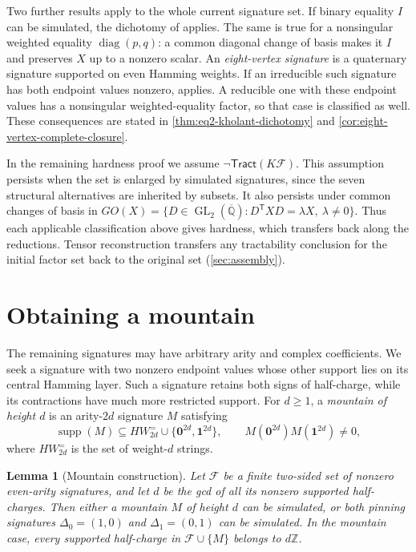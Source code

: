 \documentclass[11pt,letterpaper,onecolumn]{article}
\theoremstyle{plain}
\newtheorem{lemma}[lemma]{Lemma}
\theoremstyle{definition}
\theoremstyle{remark}
\newcommand{\AlgNums}{\overline{\mathbb Q}}
\newcommand{\cF}{\mathcal F}
\newcommand{\Tract}{\mathsf{Tract}}
\newcommand{\GL}{\operatorname{GL}}
\newcommand{\diag}{\operatorname{diag}}
\newcommand{\supp}{\operatorname{supp}}
\newcommand{\one}{\mathbf 1}
\newcommand{\zero}{\mathbf 0}
\begin{document}
Two further results apply to the whole current signature set. If binary
equality \(I\) can be simulated, the dichotomy of
\cite[Theorem~1.2]{Liu2026DEQ2Holant} applies. The same is true for a
nonsingular weighted equality \(\diag(p,q)\): a common diagonal change of
basis makes it \(I\) and preserves \(X\) up to a nonzero scalar.
An \emph{eight-vertex signature} is a quaternary signature supported on
even Hamming weights. If an irreducible such signature has both endpoint
values nonzero, \cite[Theorem~1.3]{Liu2026DEQ2Holant} applies. A reducible
one with these endpoint values has a nonsingular weighted-equality
factor, so that case is classified as well. These consequences are stated in \cref{thm:eq2-kholant-dichotomy} and
\cref{cor:eight-vertex-complete-closure}.

In the remaining hardness proof we assume \(\neg\Tract(K\cF)\).
This assumption persists when the set is enlarged by simulated signatures,
since the seven structural alternatives are inherited by subsets. It also persists under
common changes of basis in
\(GO(X)=\{D\in\GL_2(\AlgNums):D^{\mathsf T}XD=\lambda X,
\ \lambda\ne0\}\). Thus each applicable classification above gives
hardness, which transfers back along the reductions. Tensor reconstruction
transfers any tractability conclusion for the initial factor set back to
the original set (\cref{sec:assembly}).

\section{Obtaining a mountain}
\label{short:sec:mountain}

The remaining signatures may have arbitrary arity and complex
coefficients. We seek a signature with two nonzero endpoint values whose
other support lies on its central Hamming layer. Such a signature retains
both signs of half-charge, while its contractions have much more
restricted support. For \(d\ge1\), a \emph{mountain of height \(d\)} is an
arity-\(2d\) signature \(M\) satisfying
\[
\supp(M)\subseteq HW_{2d}^{=}\cup\{\zero^{2d},\one^{2d}\},
\qquad M(\zero^{2d})M(\one^{2d})\ne0,
\]
where \(HW_{2d}^{=}\) is the set of weight-\(d\) strings.

\begin{lemma}[Mountain construction]
\label{short:lem:mountain}
Let \(\cF\) be a finite two-sided set of nonzero even-arity signatures, and
let \(d\) be the gcd of all its nonzero supported half-charges. Then either
a mountain \(M\) of height \(d\) can be simulated, or both
pinning signatures \(\Delta_0=(1,0)\) and \(\Delta_1=(0,1)\) can be simulated.
In the mountain case, every supported half-charge in
\(\cF\cup\{M\}\) belongs to \(d\mathbb Z\).
\end{lemma}
\end{document}
